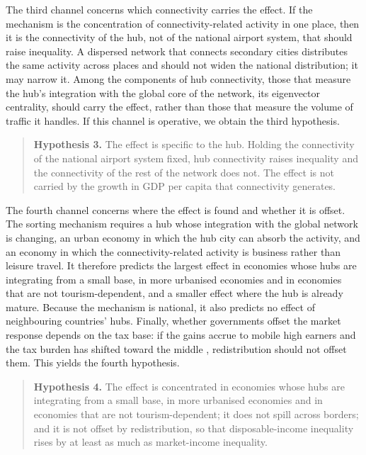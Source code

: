 The third channel concerns which connectivity carries the effect. If the mechanism is the concentration of connectivity-related activity in one place, then it is the connectivity of the hub, not of the national airport system, that should raise inequality. A dispersed network that connects secondary cities distributes the same activity across places and should not widen the national distribution; it may narrow it. Among the components of hub connectivity, those that measure the hub's integration with the global core of the network, its eigenvector centrality, should carry the effect, rather than those that measure the volume of traffic it handles. If this channel is operative, we obtain the third hypothesis.

\begin{quote}
\textbf{Hypothesis 3.} The effect is specific to the hub. Holding the connectivity of the national airport system fixed, hub connectivity raises inequality and the connectivity of the rest of the network does not. The effect is not carried by the growth in GDP per capita that connectivity generates.
\end{quote}

The fourth channel concerns where the effect is found and whether it is offset. The sorting mechanism requires a hub whose integration with the global network is changing, an urban economy in which the hub city can absorb the activity, and an economy in which the connectivity-related activity is business rather than leisure travel. It therefore predicts the largest effect in economies whose hubs are integrating from a small base, in more urbanised economies and in economies that are not tourism-dependent, and a smaller effect where the hub is already mature. Because the mechanism is national, it also predicts no effect of neighbouring countries' hubs. Finally, whether governments offset the market response depends on the tax base: if the gains accrue to mobile high earners and the tax burden has shifted toward the middle \citep{Egger_2019,Kleven_2013}, redistribution should not offset them. This yields the fourth hypothesis.

\begin{quote}
\textbf{Hypothesis 4.} The effect is concentrated in economies whose hubs are integrating from a small base, in more urbanised economies and in economies that are not tourism-dependent; it does not spill across borders; and it is not offset by redistribution, so that disposable-income inequality rises by at least as much as market-income inequality.
\end{quote}

